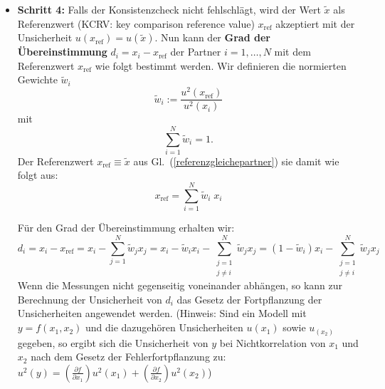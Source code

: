 \begin{itemize}
\item \textbf{Schritt 4:}  \newline
Falls der Konsistenzcheck nicht fehlschlägt, wird der Wert $\tilde x$ als
Referenzwert (KCRV: key comparison reference value) $x_\mathrm{ref}$ akzeptiert
mit der Unsicherheit $u(x_\mathrm{ref}) = u(\tilde x)$. Nun kann der \textbf{Grad 
der Übereinstimmung} $d_i = x_i - x_\mathrm{ref}$ der Partner $i=1,\dots, N$ mit dem Referenzwert $x_\mathrm{ref}$ wie folgt bestimmt werden. 
Wir definieren die normierten Gewichte $\tilde w_i$
\begin{equation}
\tilde w_i := \frac{u^2(x_\mathrm{ref})}{u^2(x_i)}
\label{eq:anteile}
\end{equation}
mit
\begin{equation}
\sum_{i=1}^{N} \tilde w_i = 1 .
\label{eq:normierung}
\end{equation}
Der Referenzwert $x_\mathrm{ref} \equiv \tilde x$ aus Gl.~(\ref{referenzgleichepartner}) sie damit wie folgt aus: 
\begin{equation}
x_\mathrm{ref} = \sum_{i=1}^{N} \tilde w_i\; x_i
\label{referenzgleichepartner2}
\end{equation}

Für den Grad der Übereinstimmung erhalten wir: 
\begin{equation}
d_i = x_i - x_\mathrm{ref} = x_i - \sum_{j=1}^{N} \tilde w_j x_j 
= x_i - \tilde w_i x_i - \sum_{\substack{j=1 \\ j \neq i}}^{N} \tilde w_j x_j 
= (1-\tilde w_i)x_i - \sum_{\substack{j=1 \\ j \neq i}}^{N} \tilde w_j x_j 
\end{equation}
Wenn die Messungen nicht gegenseitig voneinander abhängen, so kann 
zur Berechnung der Unsicherheit von $d_i$ das Gesetz der Fortpflanzung
der Unsicherheiten angewendet werden. (Hinweis: Sind ein Modell mit $y=f(x_1, x_2)$ und 
die dazugehören Unsicherheiten $u(x_1)$ sowie $u_(x_2)$ gegeben, so ergibt sich die Unsicherheit von
$y$ bei Nichtkorrelation von $x_1$ und $x_2$ nach dem Gesetz der Fehlerfortpflanzung zu: 
$u^2(y)=\left(\frac{\partial f}{\partial x_1}\right)u^2(x_1)+\left(\frac{\partial f}{\partial x_2}\right)u^2(x_2)$)


\end{itemize}
